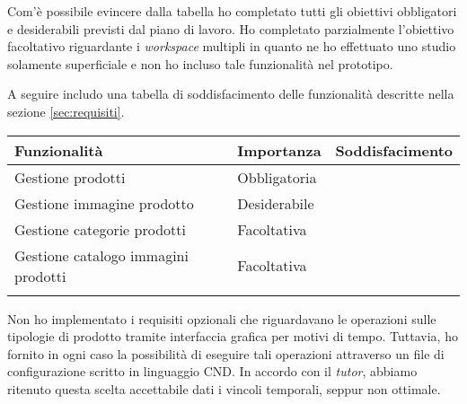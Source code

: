 		Com'è possibile evincere dalla tabella ho completato tutti gli obiettivi obbligatori e desiderabili previsti dal piano di lavoro. Ho completato parzialmente l'obiettivo facoltativo riguardante i \textit{workspace} multipli in quanto ne ho effettuato uno studio solamente superficiale e non ho incluso tale funzionalità nel prototipo.
		
		A seguire includo una tabella di soddisfacimento delle funzionalità descritte nella sezione \ref{sec:requisiti}.
		
			\begin{tabularx}{\textwidth}{|l| X |c|}
				\hline
				\textbf{Funzionalità} & \textbf{Importanza} & \textbf{Soddisfacimento} \\ 
				\hline
				Gestione prodotti & Obbligatoria & \greencheck\\
				\hline
				Gestione immagine prodotto & Desiderabile & \greencheck\\
				\hline
				Gestione categorie prodotti & Facoltativa & \yellowcheck\\
				\hline
				Gestione catalogo immagini prodotti & Facoltativa & \redx\\
				\hline
				\caption{Soddisfacimento requisiti.}
			\end{tabularx}
		
		Non ho implementato i requisiti opzionali che riguardavano le operazioni sulle tipologie di prodotto tramite interfaccia grafica per motivi di tempo. Tuttavia, ho fornito in ogni caso la possibilità di eseguire tali operazioni attraverso un file di configurazione scritto in linguaggio CND. In accordo con il \textit{tutor}, abbiamo ritenuto questa scelta accettabile dati i vincoli temporali, seppur non ottimale.
		
		
		
	
